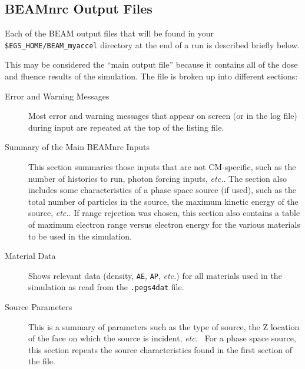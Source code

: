 \documentclass[12pt,twoside]{article}
\newcommand{\etc}{{\em etc.}}
\begin{document}
\subsection{BEAMnrc Output Files}
\label{outputfilessect}

Each of the BEAM output
files that will be found in
your {\tt \$EGS\_HOME/BEAM\_myaccel} directory at the end of a run
is described briefly below.

\begin{description}

\item [.egslst]
      This may be considered the ``main output file'' because it contains all of
the dose and fluence results of the simulation.  The file is broken up
into different sections:

\begin{description}

\item [Error and Warning Messages]
  

Most error and warning messages that appear on screen (or in the log
file) during input are repeated at the top of the listing file.

\item [Summary of the Main BEAMnrc Inputs]
 This section summaries those inputs that are not CM-specific, such as the
number of histories to run, photon forcing inputs, \etc.  The
section also includes some characteristics of a phase space source (if
used), such as
the total number of particles in the source, the maximum kinetic energy of the
source, \etc.  If range rejection was chosen, this section also contains a table
of maximum electron range versus electron energy for the various materials to
be used in the simulation.

\item [Material Data]
Shows relevant data (density, \verb+AE+, \verb+AP+, \etc) for all materials used
in the simulation as read from the \verb+.pegs4dat+ file.

\item [Source Parameters]
 This is a summary of parameters such as the type of source, the Z location of
the face on which the source is incident, \etc~  For a phase space source, this
section repeats the source characteristics found in the first section of the
file.


\end{description}
\end{description}
\end{document}
